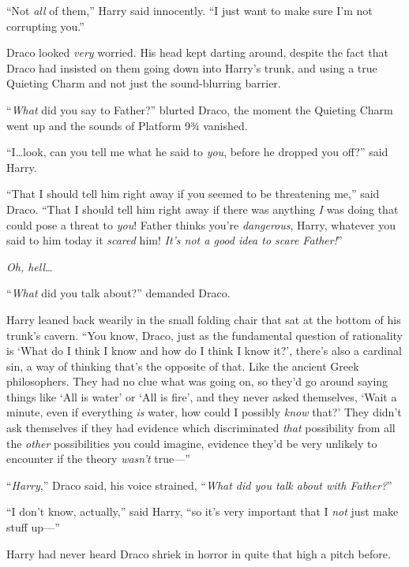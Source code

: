 “Not \emph{all} of them,” Harry said innocently. “I just want to make sure I’m not corrupting you.”

\later

Draco looked \emph{very} worried. His head kept darting around, despite the fact that Draco had insisted on them going down into Harry’s trunk, and using a true Quieting Charm and not just the sound-blurring barrier.

“\emph{What} did you say to Father?” blurted Draco, the moment the Quieting Charm went up and the sounds of Platform 9¾ vanished.

“I…look, can you tell me what he said to \emph{you}, before he dropped you off?” said Harry.

“That I should tell him right away if you seemed to be threatening me,” said Draco. “That I should tell him right away if there was anything \emph{I} was doing that could pose a threat to \emph{you}! Father thinks you’re \emph{dangerous}, Harry, whatever you said to him today it \emph{scared} him! \emph{It’s not a good idea to scare Father!}”

\emph{Oh, hell…}

“\emph{What} did you talk about?” demanded Draco.

Harry leaned back wearily in the small folding chair that sat at the bottom of his trunk’s cavern. “You know, Draco, just as the fundamental question of rationality is ‘What do I think I know and how do I think I know it?’, there’s also a cardinal sin, a way of thinking that’s the opposite of that. Like the ancient Greek philosophers. They had no clue what was going on, so they’d go around saying things like ‘All is water’ or ‘All is fire’, and they never asked themselves, ‘Wait a minute, even if everything \emph{is} water, how could I possibly \emph{know} that?’ They didn’t ask themselves if they had evidence which discriminated \emph{that} possibility from all the \emph{other} possibilities you could imagine, evidence they’d be very unlikely to encounter if the theory \emph{wasn’t} true—”

“\emph{Harry},” Draco said, his voice strained, “\emph{What did you talk about with Father?}”

“I don’t know, actually,” said Harry, “so it’s very important that I \emph{not} just make stuff up—”

Harry had never heard Draco shriek in horror in quite that high a pitch before.

